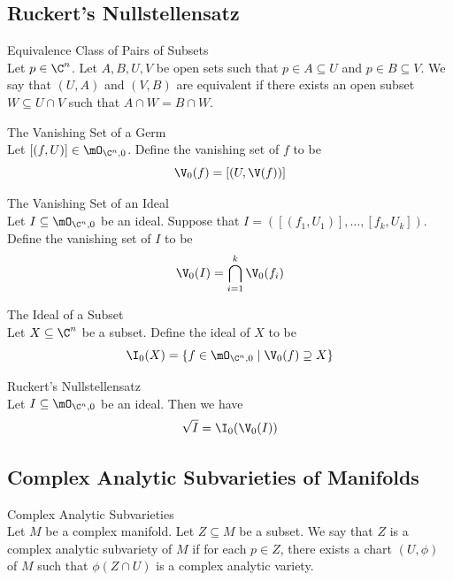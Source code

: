 \documentclass[a4paper]{article}
\begin{document}
\subsection{Ruckert's Nullstellensatz}
\begin{defn}{Equivalence Class of Pairs of Subsets}{}\\
Let $p\in\C^n$. Let $A,B,U,V$ be open sets such that $p\in A\subseteq U$ and $p\in B\subseteq V$. We say that $(U,A)$ and $(V,B)$ are equivalent if there exists an open subset $W\subseteq U\cap V$ such that $A\cap W=B\cap W$. 
\end{defn}

\begin{defn}{The Vanishing Set of a Germ}{}\\
Let $[(f,U)]\in\mO_{\C^n,0}$. Define the vanishing set of $f$ to be $$\V_0(f)=[(U,\V(f))]$$
\end{defn}

\begin{defn}{The Vanishing Set of an Ideal}{}\\
Let $I\subseteq\mO_{\C^n,0}$ be an ideal. Suppose that $I=([(f_1,U_1)],\dots,[f_k,U_k])$. Define the vanishing set of $I$ to be $$\V_0(I)=\bigcap_{i=1}^k\V_0(f_i)$$
\end{defn}

\begin{defn}{The Ideal of a Subset}{}\\
Let $X\subseteq\C^n$ be a subset. Define the ideal of $X$ to be $$\I_0(X)=\{f\in\mO_{\C^n,0}\;|\;\V_0(f)\supseteq X\}$$
\end{defn}

\begin{thm}{Ruckert's Nullstellensatz}{}\\
Let $I\subseteq\mO_{\C^n,0}$ be an ideal. Then we have $$\sqrt{I}=\I_0(\V_0(I))$$
\end{thm}

\subsection{Complex Analytic Subvarieties of Manifolds}
\begin{defn}{Complex Analytic Subvarieties}{}\\
Let $M$ be a complex manifold. Let $Z\subseteq M$ be a subset. We say that $Z$ is a complex analytic subvariety of $M$ if for each $p\in Z$, there exists a chart $(U,\phi)$ of $M$ such that $\phi(Z\cap U)$ is a complex analytic variety. 
\end{defn}
\end{document}
